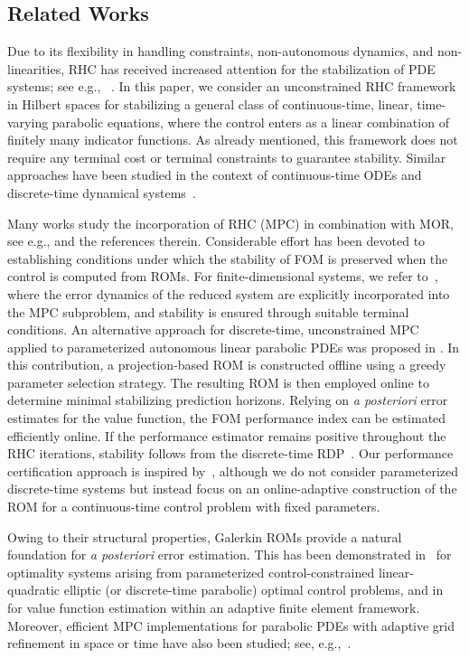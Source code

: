 \documentclass{m2an}
\begin{document}
\subsection{Related Works}
%
Due to its flexibility in handling constraints, non-autonomous dynamics, and non-linearities, RHC has received increased attention for the stabilization of PDE systems; see e.g., ~\cite{IK02,G09,BF20,azmi2019hybrid}. In this paper, we consider an unconstrained RHC framework in Hilbert spaces for stabilizing a general class of continuous-time, linear, time-varying parabolic equations, where the control enters as a linear combination of finitely many indicator functions. As already mentioned, this framework does not require any terminal cost or terminal constraints to guarantee stability. Similar approaches have been studied in the context of continuous-time ODEs \cite{RA12,JH05} and discrete-time dynamical systems~\cite{GR08,G09}.

Many works study the incorporation of RHC (MPC) in combination with MOR, see e.g., \cite{AV15,ARV25,GU14,kartmann2024certifiedmodelpredictivecontrol} and the references therein. Considerable effort has been devoted to establishing conditions under which the stability of FOM is preserved when the control is computed from ROMs. For finite-dimensional systems, we refer to~\cite{loehning2014model,LMFP22,APKCSZHP23}, where the error dynamics of the reduced system are explicitly incorporated into the MPC subproblem, and stability is ensured through suitable terminal conditions.
An alternative approach for discrete-time, unconstrained MPC applied to parameterized autonomous linear parabolic PDEs was proposed in \cite{dietze2023reduced}. In this contribution, a projection-based ROM is constructed offline using a greedy parameter selection strategy. The resulting ROM is then employed online to determine minimal stabilizing prediction horizons. Relying on \emph{a posteriori} error estimates for the value function, the FOM performance index can be estimated efficiently online. If the performance estimator remains positive throughout the RHC iterations, stability follows from the discrete-time RDP~\cite{grune2017nonlinear}. Our performance certification approach is inspired by~\cite{dietze2023reduced}, although we do not consider parameterized discrete-time systems but instead focus on an online-adaptive construction of the ROM for a continuous-time control problem with fixed parameters.

Owing to their structural properties, Galerkin ROMs provide a natural foundation for \emph{a posteriori} error estimation. This has been demonstrated in~\cite{dietze2023reduced,karcher2018certified,ali2020reduced} for optimality systems arising from parameterized control-constrained linear-quadratic elliptic (or discrete-time parabolic) optimal control problems, and in~\cite{ran,vexler2008adaptive} for value function estimation within an adaptive finite element framework. Moreover, efficient MPC implementations for parabolic PDEs with adaptive grid refinement in space or time have also been studied; see, e.g.,~\cite{GSS22,AGH22}.
%
\end{document}
